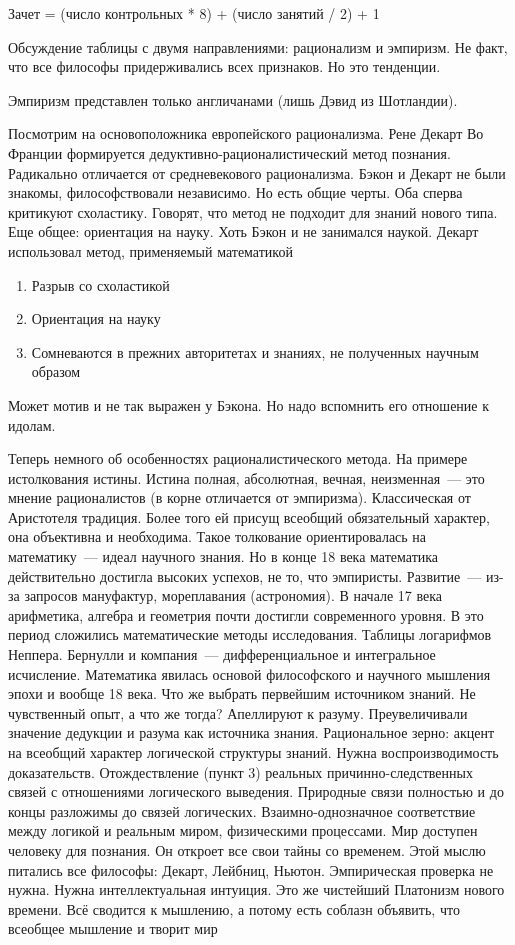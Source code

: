 Зачет = (число контрольных * 8) + (число занятий / 2) + 1

Обсуждение таблицы с двумя направлениями: рационализм и эмпиризм. Не факт, что все философы придерживались всех признаков. Но это тенденции.

Эмпиризм представлен только англичанами (лишь Дэвид из Шотландии).

Посмотрим на основоположника европейского рационализма. Рене Декарт
Во Франции формируется дедуктивно-рационалистический метод познания. Радикально отличается от средневекового рационализма. Бэкон и Декарт не были знакомы, философствовали независимо. Но есть общие черты. Оба сперва критикуют схоластику. Говорят, что метод не подходит для знаний нового типа. Еще общее: ориентация на науку. Хоть Бэкон и не занимался наукой. Декарт использовал метод, применяемый математикой

\begin{enumerate}
	\item Разрыв со схоластикой
	\item Ориентация на науку
	\item Сомневаются в прежних авторитетах и знаниях, не полученных научным образом
\end{enumerate}
Может мотив и не так выражен у Бэкона. Но надо вспомнить его отношение к идолам.

Теперь немного об особенностях рационалистического метода. На примере истолкования истины.
Истина полная, абсолютная, вечная, неизменная~--- это мнение рационалистов (в корне отличается от эмпиризма). Классическая от Аристотеля традиция. Более того ей присущ всеобщий обязательный характер, она объективна и необходима. Такое толкование ориентировалась на математику~--- идеал научного знания. Но в конце 18 века математика действительно достигла высоких успехов, не то, что эмпиристы. Развитие~--- из-за запросов мануфактур, мореплавания (астрономия). В начале 17 века арифметика, алгебра и геометрия почти достигли современного уровня. В это период сложились математические методы исследования. Таблицы логарифмов Неппера. Бернулли и компания~--- дифференциальное и интегральное исчисление. Математика явилась основой философского и научного мышления эпохи и вообще 18 века. Что же выбрать первейшим источником знаний. Не чувственный опыт, а что же тогда? Апеллируют к разуму. Преувеличивали значение дедукции и разума как источника знания. Рациональное зерно: акцент на всеобщий характер логической структуры знаний. Нужна воспроизводимость доказательств. 
Отождествление (пункт 3) реальных причинно-следственных связей с отношениями логического выведения. Природные связи полностью и до концы разложимы до связей логических. Взаимно-однозначное соответствие между логикой и реальным миром, физическими процессами. Мир доступен человеку для познания. Он откроет все свои тайны со временем. Этой мыслю питались все философы: Декарт, Лейбниц, Ньютон. Эмпирическая проверка не нужна. Нужна интеллектуальная интуиция. Это же чистейший Платонизм нового времени. Всё сводится к мышлению, а потому есть соблазн объявить, что всеобщее мышление и творит мир

